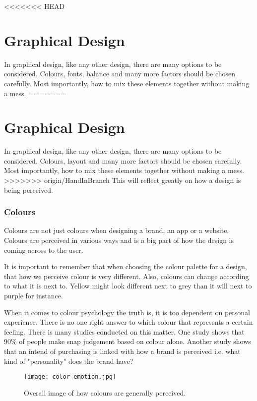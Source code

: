 <<<<<<< HEAD
\section{Graphical Design}\label{GraphicalDesign}
In graphical design, like any other design, there are many options to be considered. Colours, fonts, balance and many more factors should be chosen carefully. Most importantly, how to mix these elements together without making a mess. 
=======
\section{Graphical Design}
In graphical design, like any other design, there are many options to be considered. Colours, layout and many more factors should be chosen carefully. Most importantly, how to mix these elements together without making a mess. 
>>>>>>> origin/HandInBranch
This will reflect greatly on how a design is being perceived. \cite{ColorMeaning}

\subsubsection{Colours}\label{Colours}

Colours are not just colours when designing a brand, an app or a website. Colours are perceived in various ways and is a big part of how the design is coming  across to the user. \cite{ColorMeaning}

It is important to remember that when choosing the colour palette for a design, that how we perceive colour is very different. Also, colours can change according to what it is next to. Yellow might look different next to grey than it will next to purple for instance. \cite{Colour}

When it comes to colour psychology the truth is, it is too dependent on personal experience. There is no one right answer to which colour that represents a certain feeling. \cite{ColorMeaning}
There is many studies conducted on this matter. 
One study shows that 90\% of people make snap judgement based on colour alone. \cite{ColorMeaning} Another study shows that an intend of purchasing is linked with how a brand is perceived i.e. what kind of "personality" does the brand have?\cite{ColorMeaning}

\begin{figure}[H]
\centering
\texttt{[image: color-emotion.jpg]}
\caption{Overall image of how colours are generally perceived.} \cite{ColorMeaning}
\end{figure}


